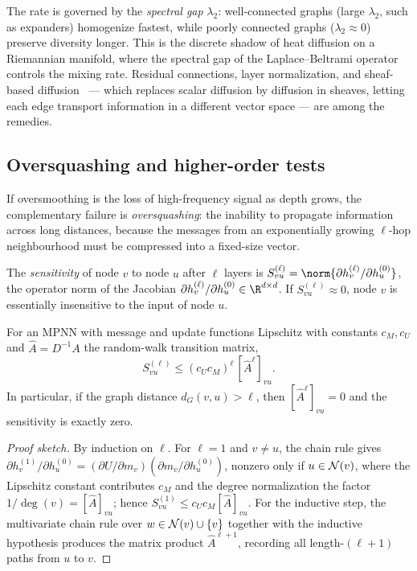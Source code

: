 The rate is governed by the \emph{spectral gap} $\lambda_2$: well-connected
graphs (large $\lambda_2$, such as expanders) homogenize fastest, while poorly
connected graphs ($\lambda_2 \approx 0$) preserve diversity longer. This is the
discrete shadow of heat diffusion on a Riemannian manifold, where the spectral
gap of the Laplace--Beltrami operator controls the mixing rate. Residual
connections, layer normalization, and sheaf-based diffusion~\citep{bodnar2022neural}
--- which replaces scalar diffusion by diffusion in sheaves, letting each edge
transport information in a different vector space --- are among the remedies.

\subsection{Oversquashing and higher-order tests}
\label{sec:graphs:oversquashing}

If oversmoothing is the loss of high-frequency signal as depth grows, the
complementary failure is \emph{oversquashing}: the inability to propagate
information across long distances, because the messages from an exponentially
growing $\ell$-hop neighbourhood must be compressed into a fixed-size vector.

\begin{definition}
\label{def:graphs:sensitivity}
The \emph{sensitivity} of node $v$ to node $u$ after $\ell$ layers is
$S_{vu}^{(\ell)} = \norm{\partial h_v^{(\ell)} / \partial h_u^{(0)}}$, the
operator norm of the Jacobian $\partial h_v^{(\ell)} / \partial h_u^{(0)} \in
\R^{d \times d}$. If $S_{vu}^{(\ell)} \approx 0$, node $v$ is essentially
insensitive to the input of node $u$.
\end{definition}

\begin{proposition}
\label{prop:graphs:oversquashing}
For an MPNN with message and update functions Lipschitz with constants
$c_M, c_U$ and $\hat A = D^{-1} A$ the random-walk transition matrix,
\[
  S_{vu}^{(\ell)} \le (c_U c_M)^\ell\, [\hat A^\ell]_{vu}.
\]
In particular, if the graph distance $d_G(v,u) > \ell$, then
$[\hat A^\ell]_{vu} = 0$ and the sensitivity is exactly zero.
\end{proposition}

\begin{proof}[Proof sketch]
By induction on $\ell$. For $\ell = 1$ and $v \neq u$, the chain rule gives
$\partial h_v^{(1)} / \partial h_u^{(0)}
= (\partial U / \partial m_v)(\partial m_v / \partial h_u^{(0)})$, nonzero only if
$u \in \mathcal{N}(v)$, where the Lipschitz constant contributes $c_M$ and the degree
normalization the factor $1/\deg(v) = [\hat A]_{vu}$; hence
$S_{vu}^{(1)} \le c_U c_M [\hat A]_{vu}$. For the inductive step, the multivariate
chain rule over $w \in \mathcal{N}(v) \cup \{v\}$ together with the inductive hypothesis
produces the matrix product $\hat A^{\ell+1}$, recording all length-$(\ell+1)$
paths from $u$ to $v$.
\end{proof}

